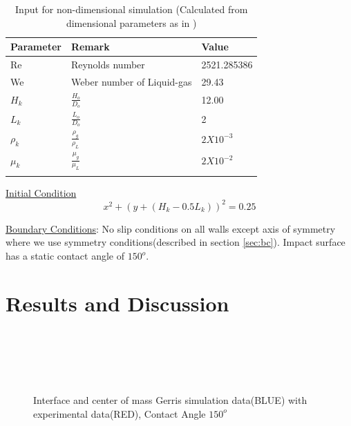  \begin{table}
  \begin{center}
   \caption{Input for non-dimensional simulation (Calculated from dimensional parameters as in \cite{Hung2011})}
 \label{Table:input}
    \begin{tabular}{lll}
      \toprule 
      Parameter & Remark & Value  \\ 
      \midrule
	Re & Reynolds number & 2521.285386 \\
	We & Weber number of Liquid-gas & 29.43 \\
	$H_k$ & $\frac{H_o}{D_o}$ &  12.00\\
	$L_k$ & $\frac{L_o}{D_o}$ &  2 \\
	$\rho_k$ & $\frac{\rho_g}{\rho_L}$ & $2 X 10^{-3}$  \\ 
	$\mu_k$ & $\frac{\mu_g}{\mu_L}$ & $2 X 10^{-2}$ \\
      
      \bottomrule \\
    \end{tabular}
  \end{center}
\end{table}

\underline{Initial Condition} \\
\begin{equation}
 x^2+(y+(H_k-0.5L_k))^2=0.25  %
\end{equation}

\underline{Boundary Conditions}: No slip conditions on all walls except axis of symmetry where we use symmetry conditions(described in section \ref{sec:bc}). Impact surface
has a static contact angle of $150^o$.

\section{Results and Discussion}
\begin{figure}[H]
 \centering
   \\
       \\
       \\
       \\
 \caption{Interface and center of mass Gerris simulation data(BLUE) with \cite{Hung2011} experimental data(RED), Contact Angle $150^o$}
 \label{Fig:gs5}
 \end{figure}
 
